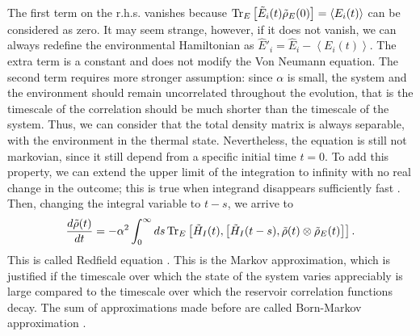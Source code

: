 The first term on the r.h.s. vanishes because $ \operatorname{Tr}_E\left[\tilde E_i(t)\tilde\rho_E(0)\right] = \left<E_i(t)\right>$ can be considered as zero. 
It may seem strange, however, if it does not vanish, we can always redefine the environmental Hamiltonian as $\hat E'_i = \hat E_i - \left<E_i(t)\right>$. The extra term is a constant and does not modify the Von Neumann equation.
The second term requires more stronger assumption: since $\alpha$ is small, the system and the environment should remain uncorrelated throughout the evolution, that is the timescale of the correlation should be much shorter than the timescale of the system. Thus, we can consider that the total density matrix is always separable, with the environment in the thermal state.
Nevertheless, the equation is still not markovian, since it still depend from a specific initial time $t= 0$. To add this property, we can extend the upper limit of the integration to infinity with no real change in the outcome; this is true when integrand disappears sufficiently fast \cite{Breuer-Petruccione}. Then, changing the integral variable to $t - s$, we arrive to 
\begin{eqnarray}\label{C_markovian}
    \frac{d\tilde \rho(t)}{dt} = -\alpha^2 \int_0^\infty ds \operatorname{Tr}_E\left[\tilde H_I(t),\left[\tilde H_I(t-s),\tilde\rho(t)\otimes\tilde\rho_E(t)\right]\right].
\end{eqnarray}
This is called Redfield equation \cite{Redfield}.
This is the Markov approximation, which is justified if the timescale over which the state of the system varies appreciably is large compared to the timescale over which the reservoir correlation functions decay. The sum of approximations made before are called Born-Markov approximation \cite{Breuer-Petruccione}.


